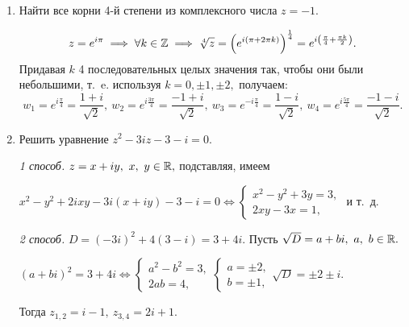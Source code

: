 \documentclass[../../main.tex]{subfiles}
\begin{document}
\begin{examples}
\begin{enumerate}
			
		\item Найти все корни 4-й степени из комплексного числа $z = -1.$
		
		\[z = e^{i\pi} \implies \forall k\in\mathbb{Z} \implies \sqrt[4]{z} =
		\left(e^{i(\pi+2\pi k)}\right)^{\frac{1}{4}} = e^{i\left(
			\frac{\pi}{4}+\frac{\pi k}{2}\right)}.  \]
		Придавая $k$ 4 последовательных целых значения так, чтобы они были 
		небольшими, т.~e. используя $k = 0, \pm 1, \pm 2,$ получаем:
		\[w_1 = e^{i\frac{\pi}{4}} = \frac{1+i}{\sqrt{2}},\ w_2 = 
		e^{i\frac{3\pi}{4}} = \frac{-1+i}{\sqrt{2}},\
		w_3 = e^{-i\frac{\pi}{4}} = \frac{1-i}{\sqrt{2}},\ w_4 = 
		e^{i\frac{5\pi}{4}} = \frac{-1-i}{\sqrt{2}}.\]
		
		\item Решить уравнение $z^2 - 3iz - 3- i = 0.$
		
		\emph{1 способ.} $z = x+iy,\ x,\ y\in\R,$ подставляя, имеем
		
		$x^2 - y^2 +2ixy - 3i(x+iy) - 3- i =0 \Leftrightarrow
		 \left\{
		\begin{gathered} 
		x^2 - y^2 + 3y  = 3,\\
		2xy - 3x  =1,
		\end{gathered}\right.$ и т.~д.
		
		\emph{2 способ.}
		$D = (-3i)^2 + 4(3-i) =3+4i.$ Пусть $\sqrt{D} = a + bi,\ a,\ b \in \mathbb{R}.$
		
		$(a+bi)^2 = 3+4i \Leftrightarrow  \left\{
		\begin{gathered} 
		a^2 - b^2 = 3,\\
		2ab  = 4,
		\end{gathered}\right.
		\left\{
		\begin{gathered} 
		a = \pm 2,\\
		b  = \pm 1,
		\end{gathered}\right.
		\sqrt{D} = \pm2\pm i.
		$
		
		Тогда $z_{1, 2} = i-1,\ z_{3, 4} =2i+1. $
		\end{enumerate}
		\end{examples}
\end{document}
